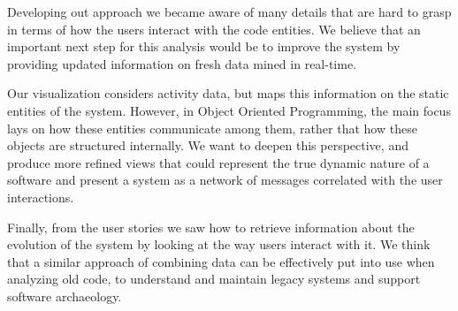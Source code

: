 Developing out approach we became aware of many details that are hard to grasp in terms of how the users interact with the code entities.
We believe that an important next step for this analysis would be to improve the system by providing updated information on fresh data mined in real-time.

Our visualization considers activity data, but maps this information on the static entities of the system.
However, in Object Oriented Programming, the main focus lays on how these entities communicate among them, rather that how these objects are structured internally.
We want to deepen this perspective, and produce more refined views that could represent the true dynamic nature of a software and present a system as a network of messages correlated with the user interactions.

Finally, from the user stories we saw how to retrieve information about the evolution of the system by looking at the way users interact with it.
We think that a similar approach of combining data can be effectively put into use when analyzing old code, to understand and maintain legacy systems and support software archaeology.
